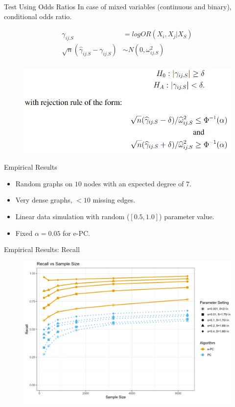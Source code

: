 \documentclass{beamer}
\begin{document}
\begin{frame}{Test Using Odds Ratios}
	In case of mixed variables (continuous and binary), conditional odds ratio.

	\begin{equation*}
		\begin{split}
			\gamma_{ij.S} &= log OR(X_i, X_j \rvert X_S) \\
			\sqrt{n}(\hat{\gamma}_{ij.S} - \gamma_{ij.S}) &\sim N(0, \omega^2_{ij.S}) \\
		\end{split}
	\end{equation*}
	\begin{figure}
		\centering
		\includegraphics[scale=0.3]{imgs/test3.png}
	\end{figure}
\end{frame}

\begin{frame}{Empirical Results}
	\begin{itemize}
		\item Random graphs on $ 10 $ nodes with an expected degree of $ 7 $.
		\item Very dense graphs, $ < 10 $ missing edges.
		\item Linear data simulation with random ($ [0.5, 1.0] $) parameter value.
		\item Fixed $ \alpha = 0.05 $ for e-PC.
	\end{itemize}
\end{frame}

\begin{frame}{Empirical Results: Recall}
	\begin{figure}
		\centering
		\includegraphics[scale=0.2]{imgs/recall.png}
	\end{figure}
\end{frame}
\end{document}
